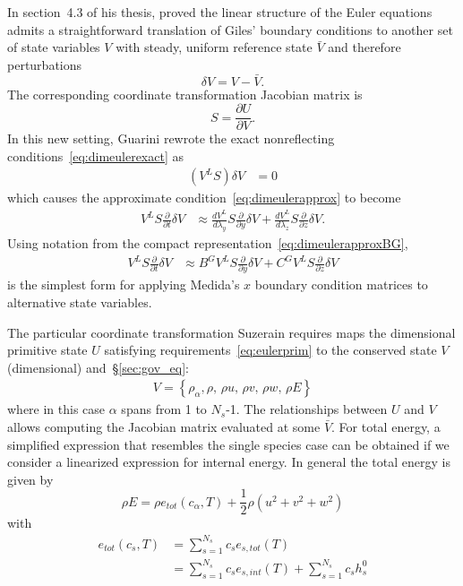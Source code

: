In section~4.3 of his thesis, \citet{Guarini1998} proved the linear
structure of the Euler equations admits a straightforward translation of Giles'
boundary conditions to another set of state variables $V$ with steady, uniform
reference state $\bar{V}$ and therefore perturbations
\[
  \delta{}V = V - \bar{V}.
\]
The corresponding coordinate transformation Jacobian matrix is
\[
   S = \frac{\partial{}U}{\partial{}V}
   .
\]
In this new setting, Guarini rewrote the exact nonreflecting
conditions~\eqref{eq:dimeulerexact} as
\begin{align}
  \left(V^L S\right) \delta{}V &= 0
\end{align}
which causes the approximate condition~\eqref{eq:dimeulerapprox} to become
\begin{align}
\label{eq:dimeulertransform}
  V^L
  S
  \frac{\partial}{\partial{}t}
  \delta{}V
  &\approx
  \frac{dV^L}{d\lambda_y}
  S
  \frac{\partial}{\partial{}y}
  \delta{}V
  +
  \frac{dV^L}{d\lambda_z}
  S
  \frac{\partial}{\partial{}z}
  \delta{}V
  .
\end{align}
Using notation from the compact representation~\eqref{eq:dimeulerapproxBG},
\begin{align}
\label{eq:dimeulertransformcharnot}
  V^L S
  \frac{\partial}{\partial{}t}
  \delta{}V
  &\approx
  B^G V^L S
  \frac{\partial}{\partial{}y}
  \delta{}V
  +
  C^G V^L S
  \frac{\partial}{\partial{}z}
  \delta{}V
\end{align}
is the simplest form for applying Medida's $x$ boundary condition matrices to
alternative state variables.

The particular coordinate transformation Suzerain requires maps the dimensional
primitive state $U$ satisfying requirements~\eqref{eq:eulerprim} to the
conserved state $V$ (dimensional) and~\S\ref{sec:gov_eq}:
%
\begin{align}
\label{eq:multieulerconsdim}
V
= \left\{
    \rho_\alpha,
    \rho,
  \,\rho u,
  \,\rho v,
  \,\rho w,
  \,\rho E
\right\}
\end{align}
%
where in this case $\alpha$ spans from 1 to $N_s$-1.
The relationships between $U$ and $V$ allows computing the Jacobian matrix
evaluated at some $\bar{V}$.  For total energy, a simplified expression that
resembles the single species case can be obtained if we consider a linearized
expression for internal energy. In general the total energy is given by
%
\begin{equation}
\rho E = \rho e_{tot}(c_\alpha, T) + \frac{1}{2} \rho \left( u^2 + v^2+ w^2 \right)
\end{equation}
%
with 
%
\begin{equation}
\begin{split}
e_{tot}(c_s, T) 
&= \sum_{s=1}^{N_s} c_s e_{s,tot}(T)  \\
&= \sum_{s=1}^{N_s} c_s e_{s,int}(T) + \sum_{s=1}^{N_s} c_s h^0_s 
\end{split}
\end{equation}
%

